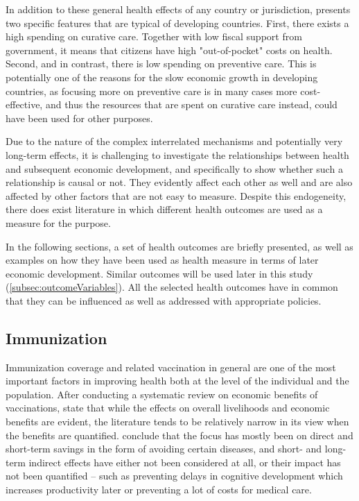 \documentclass[12pt,a4paper,notitlepage]{article}
\begin{document}
In addition to these general health effects of any country or jurisdiction, \citet{Dupas:2011} presents two specific features that are typical of developing countries. First, there exists a high spending on curative care. Together with low fiscal support from government, it means that citizens have high "out-of-pocket" costs on health. Second, and in contrast, there is low spending on preventive care. This is potentially one of the reasons for the slow economic growth in developing countries, as focusing more on preventive care is in many cases more cost-effective, and thus the resources that are spent on curative care instead, could have been used for other purposes.

Due to the nature of the complex interrelated mechanisms and potentially very long-term effects, it is challenging to investigate the relationships between health and subsequent economic development, and specifically to show whether such a relationship is causal or not. They evidently affect each other as well and are also affected by other factors that are not easy to measure. Despite this endogeneity, there does exist literature in which different health outcomes are used as a measure for the purpose.

In the following sections, a set of health outcomes are briefly presented, as well as examples on how they have been used as health measure in terms of later economic development. Similar outcomes will be used later in this study (\cref{subsec:outcomeVariables}). All the selected health outcomes have in common that they can be influenced as well as addressed with appropriate policies.

\subsection{Immunization}

Immunization coverage and related vaccination in general are one of the most important factors in improving health both at the level of the individual and the population. After conducting a systematic review on economic benefits of vaccinations, \citet{Ozawa:2012} state that while the effects on overall livelihoods and economic benefits are evident, the literature tends to be relatively narrow in its view when the benefits are quantified. \citet{Ozawa:2012} conclude that the focus has mostly been on direct and short-term savings in the form of avoiding certain diseases, and short- and long-term indirect effects have either not been considered at all, or their impact has not been quantified -- such as preventing delays in cognitive development which increases productivity later or preventing a lot of costs for medical care.
\end{document}
